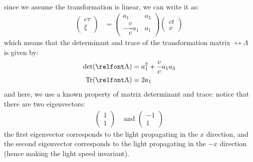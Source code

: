 since we assume the transformation is linear, we can write it as:
\begin{align}
  \begin{pmatrix}
    c \tau \\
    \xi
  \end{pmatrix} & = \begin{pmatrix}
                      a_1                & a_3 \\[6pt]
                      - \dfrac{v}{c} a_1 & a_1
                    \end{pmatrix} \begin{pmatrix}
                                    c t \\
                                    x
                                  \end{pmatrix}
\end{align}
which means that the determinant and trace of the transformation matrix $\rel{\Lambda}$ is given by:
\begin{align}
  \det(\rel{\Lambda}) & = a_1^2 + \frac{v}{c} a_1 a_3 \\
  \Tr(\rel{\Lambda})  & = 2a_1
\end{align}
and here, we use a known property of matrix determinant and trace:
notice that there are two eigenvectors:
\begin{align}
  \begin{pmatrix}
    1 \\
    1
  \end{pmatrix} & \text{ and } \begin{pmatrix}
                                 -1 \\
                                 1
                               \end{pmatrix}
\end{align}
the first eigenvector corresponds to the light propagating in the $x$ direction, and the second eigenvector corresponds to the light propagating in the $-x$ direction (hence making the light speed invariant).

